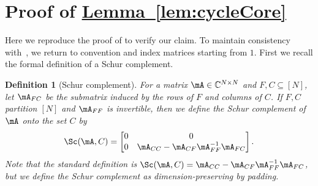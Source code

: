 \documentclass[11pt]{article}
\newcommand{\expref}[2]{\texorpdfstring{\hyperref[#2]{#1~\ref{#2}}}{#1~\ref{#2}}}
\newtheorem{definition}[theorem]{Definition}
\newcommand{\C}{{\mathbb C}}
\begin{document}
\section{Proof of \expref{Lemma}{lem:cycleCore}}\label{sec:app}
Here we reproduce the proof of
%
\cite[Lemma 6.7]{AhmadinejadKeMuPeSiVa19} %
to verify our claim. To maintain consistency with~\cite{AhmadinejadKeMuPeSiVa19}, we return to convention and index matrices starting from $1$.
%
First we  %
recall the formal definition of a Schur complement.

\begin{definition}[Schur complement] %
  For a matrix $\mA\in \C^{N\times N}$ and $F,C\subseteq[N]$, let $\mA_{FC}$ be the submatrix induced by the rows of $F$ and columns of $C$. If $F,C$ partition $[N]$ and $\mA_{FF}$ is invertible, then we
%
define  %
the Schur complement of $\mA$ onto the set $C$ by %
%
%
%
%
\[\Sc(\mA,C) = \begin{bmatrix}
0 & 0\\
0 & \mA_{CC}-\mA_{CF}\mA_{FF}^{-1}\mA_{FC}
\end{bmatrix}.\]
Note that the standard definition is $\Sc(\mA,C)=\mA_{CC}-\mA_{CF}\mA_{FF}^{-1}\mA_{FC}$, but we define the Schur complement as dimension-preserving by padding.
%
\end{definition}
\end{document}
